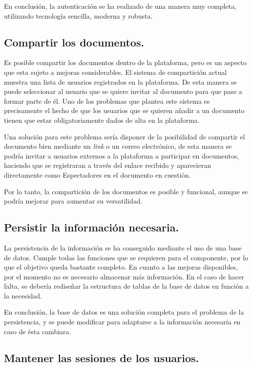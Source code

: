 \documentclass[11pt,spanish,listoffigures]{tfgetsinf}
\begin{document}
En conclusión, la autenticación se ha realizado de una manera muy completa, utilizando tecnología sencilla, moderna y robusta.

\subsection{Compartir los documentos.}
\label{subsec:objetivos-conc-compartir}

Es posible compartir los documentos dentro de la plataforma, pero es un aspecto que esta sujeto a mejoras considerables. El sistema de compartición actual muestra una lista de usuarios registrados en la plataforma. De esta manera se puede seleccionar al usuario que se quiere invitar al documento para que pase a formar parte de él. Uno de los problemas que plantea este sistema es precisamente el hecho de que los usuarios que se quieren añadir a un documento tienen que estar obligatoriamente dados de alta en la plataforma.

Una solución para este problema sería disponer de la posibilidad de compartir el documento bien mediante un \textit{\gls{link}} o un correo electrónico, de esta manera se podría invitar a usuarios externos a la plataforma a participar en documentos, haciendo que se registraran a través del enlace recibido y aparecieran directamente como Espectadores en el documento en cuestión.

Por lo tanto, la compartición de los documentos es posible y funcional, aunque se podría mejorar para aumentar su versatilidad.

\subsection{Persistir la información necesaria.}
\label{subsec:objetivos-conc-persistir}

La persistencia de la información se ha conseguido mediante el uso de una base de datos. Cumple todas las funciones que se requieren para el componente, por lo que el objetivo queda bastante completo. En cuanto a las mejoras disponibles, por el momento no es necesario almacenar más información. En el caso de hacer falta, se debería rediseñar la estructura de tablas de la base de datos en función a la necesidad. 

En conclusión, la base de datos es una solución completa para el problema de la persistencia, y se puede modificar para adaptarse a la información necesaria en caso de ésta cambiara.

\subsection{Mantener las sesiones de los usuarios.}
\label{subsec:objetivos-conc-session}
\end{document}
